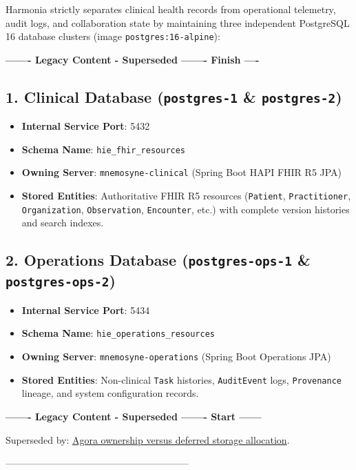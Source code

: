 Harmonia strictly separates clinical health records from operational telemetry, audit logs, and collaboration state by maintaining three independent PostgreSQL 16 database clusters (image \texttt{postgres:16-alpine}):

\par\noindent\textbf{------- Legacy Content - Superseded ------- Finish ----}


\subsection{1. Clinical Database (\texttt{postgres-1} \& \texttt{postgres-2})}
\begin{itemize}
    \item \textbf{Internal Service Port}: 5432
    \item \textbf{Schema Name}: \texttt{hie\_fhir\_resources}
    \item \textbf{Owning Server}: \texttt{mnemosyne-clinical} (Spring Boot HAPI FHIR R5 JPA)
    \item \textbf{Stored Entities}: Authoritative FHIR R5 resources (\texttt{Patient}, \texttt{Practitioner}, \texttt{Organization}, \texttt{Observation}, \texttt{Encounter}, etc.) with complete version histories and search indexes.
\end{itemize}

\subsection{2. Operations Database (\texttt{postgres-ops-1} \& \texttt{postgres-ops-2})}
\begin{itemize}
    \item \textbf{Internal Service Port}: 5434
    \item \textbf{Schema Name}: \texttt{hie\_operations\_resources}
    \item \textbf{Owning Server}: \texttt{mnemosyne-operations} (Spring Boot Operations JPA)
    \item \textbf{Stored Entities}: Non-clinical \texttt{Task} histories, \texttt{AuditEvent} logs, \texttt{Provenance} lineage, and system configuration records.
\end{itemize}


\par\noindent\textbf{------- Legacy Content - Superseded ------- Start ------}
\par\noindent Superseded by: \href{../../markdown/05-information-systems-architecture/agora-omilia-collaboration.md\#information-ownership}{Agora ownership versus deferred storage allocation}.
\par\noindent ---------------------------------------------------------

